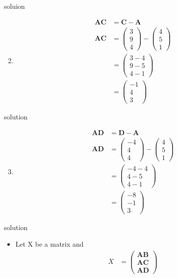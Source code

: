 \documentclass{beamer}
\let\vec\mathbf
\newcommand{\myvec}[1]{\ensuremath{\begin{pmatrix}#1\end{pmatrix}}}
\begin{document}
 
 \begin{frame}{soluion}
 \begin{enumerate}
 \setcounter{enumi}{1}
 \item 
 \begin{align}
     \vec{AC} & = \vec{C}-\vec{A}\\
     \vec{AC} & = \myvec{3\\9\\4}-\myvec{4\\5\\1}\nonumber\\
              & = \myvec{3-4\\9-5\\4-1}\nonumber\\
              & = \myvec{-1\\4\\3}
 \end{align}
 \end{enumerate}
 \end{frame}
 
 
 \begin{frame}{solution}
 \begin{enumerate}
\setcounter{enumi}{2}     
 \item 
 \begin{align}
     \vec{AD} & = \vec{D}-\vec{A}\\
     \vec{AD} & = \myvec{-4\\4\\4}-\myvec{4\\5\\1}\nonumber\\
              & = \myvec{-4-4\\4-5\\4-1}\nonumber\\
              & = \myvec{-8\\-1\\3}
 \end{align}
 \end{enumerate}
 \end{frame}
 
 \begin{frame}{solution}
 \begin{itemize}
\item 
Let X be a matrix and
\begin{align}
    X & = \myvec{\vec{AB}\\\vec{AC}\\\vec{AD}}
\end{align}
\end{itemize}
\end{frame}
 
\end{document}
